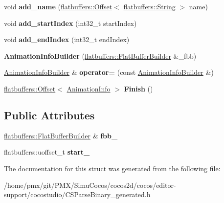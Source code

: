 \begin{DoxyCompactItemize}
void {\bfseries add\+\_\+name} (\hyperlink{structflatbuffers_1_1Offset}{flatbuffers\+::\+Offset}$<$ \hyperlink{structflatbuffers_1_1String}{flatbuffers\+::\+String} $>$ name)
\item 
\mbox{\label{structflatbuffers_1_1AnimationInfoBuilder_a6335dd20f4be223dc669b822b8b4916e}} 
void {\bfseries add\+\_\+start\+Index} (int32\+\_\+t start\+Index)
\item 
\mbox{\label{structflatbuffers_1_1AnimationInfoBuilder_a725a67cad2b0f5b5bf246d0d215ee02f}} 
void {\bfseries add\+\_\+end\+Index} (int32\+\_\+t end\+Index)
\item 
\mbox{\label{structflatbuffers_1_1AnimationInfoBuilder_a703c3a13101b3bc91c573beaf1f4da9b}} 
{\bfseries Animation\+Info\+Builder} (\hyperlink{classflatbuffers_1_1FlatBufferBuilder}{flatbuffers\+::\+Flat\+Buffer\+Builder} \&\+\_\+fbb)
\item 
\mbox{\label{structflatbuffers_1_1AnimationInfoBuilder_af0ec3bd5b0ec4cc53b13903e7fe70ed4}} 
\hyperlink{structflatbuffers_1_1AnimationInfoBuilder}{Animation\+Info\+Builder} \& {\bfseries operator=} (const \hyperlink{structflatbuffers_1_1AnimationInfoBuilder}{Animation\+Info\+Builder} \&)
\item 
\mbox{\label{structflatbuffers_1_1AnimationInfoBuilder_a2e4a7e20c811199e6f43c0131fd67f50}} 
\hyperlink{structflatbuffers_1_1Offset}{flatbuffers\+::\+Offset}$<$ \hyperlink{structflatbuffers_1_1AnimationInfo}{Animation\+Info} $>$ {\bfseries Finish} ()
\end{DoxyCompactItemize}
\subsection*{Public Attributes}
\begin{DoxyCompactItemize}
\item 
\mbox{\label{structflatbuffers_1_1AnimationInfoBuilder_acdb92efa566a7698a10d7be0c8cd32a0}} 
\hyperlink{classflatbuffers_1_1FlatBufferBuilder}{flatbuffers\+::\+Flat\+Buffer\+Builder} \& {\bfseries fbb\+\_\+}
\item 
\mbox{\label{structflatbuffers_1_1AnimationInfoBuilder_acc0a541cdc7ccc54f5199a8169714f69}} 
flatbuffers\+::uoffset\+\_\+t {\bfseries start\+\_\+}
\end{DoxyCompactItemize}


The documentation for this struct was generated from the following file\+:\begin{DoxyCompactItemize}
\item 
/home/pmx/git/\+P\+M\+X/\+Simu\+Cocos/cocos2d/cocos/editor-\/support/cocostudio/C\+S\+Parse\+Binary\+\_\+generated.\+h\end{DoxyCompactItemize}
